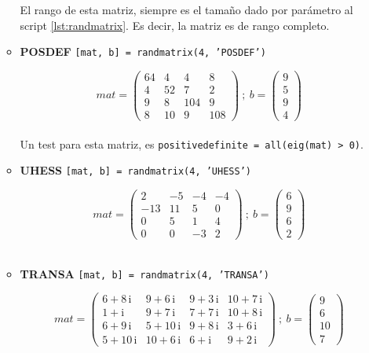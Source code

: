\documentclass[11pt, spanish]{article}
\begin{document}
\begin{enumerate}
\begin{itemize}
El rango de esta matriz, siempre es el tamaño dado por parámetro al script \ref{lst:randmatrix}. Es decir, la matriz es de rango completo.\\

\item \textbf{POSDEF} \texttt{[mat, b] = randmatrix(4, 'POSDEF')}

$$mat = \left(\begin{array}{cccc} 64 & 4 & 4 & 8\\ 4 & 52 & 7 & 2\\ 9 & 8 & 104 & 9\\ 8 & 10 & 9 & 108 \end{array}\right)\ ;\ b = \left(\begin{array}{c} 9\\ 5\\ 9\\ 4 \end{array}\right)
$$\\

Un test para esta matriz, es \texttt{positivedefinite = all(eig(mat) > 0)}.\\

\item \textbf{UHESS} \texttt{[mat, b] = randmatrix(4, 'UHESS')}

$$mat =  \left(\begin{array}{cccc} 2 & -5 & -4 & -4\\ -13 & 11 & 5 & 0\\ 0 & 5 & 1 & 4\\ 0 & 0 & -3 & 2 \end{array}\right)\ ;\ b = \left(\begin{array}{c} 6\\ 9\\ 6\\ 2 \end{array}\right)
$$\\

\item \textbf{TRANSA} \texttt{[mat, b] = randmatrix(4, 'TRANSA')}

$$mat =  \left(\begin{array}{cccc} 6 + 8\, \mathrm{i} & 9 + 6\, \mathrm{i} & 9 + 3\, \mathrm{i} & 10 + 7\, \mathrm{i}\\ 1 + \mathrm{i} & 9 + 7\, \mathrm{i} & 7 + 7\, \mathrm{i} & 10 + 8\, \mathrm{i}\\ 6 + 9\, \mathrm{i} & 5 + 10\, \mathrm{i} & 9 + 8\, \mathrm{i} & 3 + 6\, \mathrm{i}\\ 5 + 10\, \mathrm{i} & 10 + 6\, \mathrm{i} & 6 + \mathrm{i} & 9 + 2\, \mathrm{i} \end{array}\right)\ ;\ b = \left(\begin{array}{c} 9\\ 6\\ 10\\ 7 \end{array}\right)
$$
\end{itemize}


\end{enumerate}
\end{document}
